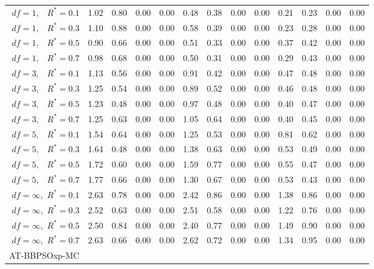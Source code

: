 \documentclass[12pt]{article}
\begin{document}
\begin{appendix}
\begin{table}[ht]
{\begin{tabular}{r|rrrr|rrrr|rrrr}
  $df = 1,\enspace$ $R^* =0.1$ & 1.02 & 0.80 & 0.00 & 0.00 & 0.48 & 0.38 & 0.00 & 0.00 & 0.21 & 0.23 & 0.00 & 0.00 \\ 
  $df = 1,\enspace$ $R^* =0.3$ & 1.10 & 0.88 & 0.00 & 0.00 & 0.58 & 0.39 & 0.00 & 0.00 & 0.23 & 0.28 & 0.00 & 0.00 \\ 
  $df = 1,\enspace$ $R^* =0.5$ & 0.90 & 0.66 & 0.00 & 0.00 & 0.51 & 0.33 & 0.00 & 0.00 & 0.37 & 0.42 & 0.00 & 0.00 \\ 
  $df = 1,\enspace$ $R^* =0.7$ & 0.98 & 0.68 & 0.00 & 0.00 & 0.50 & 0.31 & 0.00 & 0.00 & 0.29 & 0.43 & 0.00 & 0.00 \\ 
  $df = 3,\enspace$ $R^* =0.1$ & 1.13 & 0.56 & 0.00 & 0.00 & 0.91 & 0.42 & 0.00 & 0.00 & 0.47 & 0.48 & 0.00 & 0.00 \\ 
  $df = 3,\enspace$ $R^* =0.3$ & 1.25 & 0.54 & 0.00 & 0.00 & 0.89 & 0.52 & 0.00 & 0.00 & 0.46 & 0.48 & 0.00 & 0.00 \\ 
  $df = 3,\enspace$ $R^* =0.5$ & 1.23 & 0.48 & 0.00 & 0.00 & 0.97 & 0.48 & 0.00 & 0.00 & 0.40 & 0.47 & 0.00 & 0.00 \\ 
  $df = 3,\enspace$ $R^* =0.7$ & 1.25 & 0.63 & 0.00 & 0.00 & 1.05 & 0.64 & 0.00 & 0.00 & 0.40 & 0.45 & 0.00 & 0.00 \\ 
  $df = 5,\enspace$ $R^* =0.1$ & 1.54 & 0.64 & 0.00 & 0.00 & 1.25 & 0.53 & 0.00 & 0.00 & 0.81 & 0.62 & 0.00 & 0.00 \\ 
  $df = 5,\enspace$ $R^* =0.3$ & 1.64 & 0.48 & 0.00 & 0.00 & 1.38 & 0.63 & 0.00 & 0.00 & 0.53 & 0.49 & 0.00 & 0.00 \\ 
  $df = 5,\enspace$ $R^* =0.5$ & 1.72 & 0.60 & 0.00 & 0.00 & 1.59 & 0.77 & 0.00 & 0.00 & 0.55 & 0.47 & 0.00 & 0.00 \\ 
  $df = 5,\enspace$ $R^* =0.7$ & 1.77 & 0.66 & 0.00 & 0.00 & 1.30 & 0.67 & 0.00 & 0.00 & 0.53 & 0.43 & 0.00 & 0.00 \\ 
  $df = \infty,$ $R^* =0.1$ & 2.63 & 0.78 & 0.00 & 0.00 & 2.42 & 0.86 & 0.00 & 0.00 & 1.38 & 0.86 & 0.00 & 0.00 \\ 
  $df = \infty,$ $R^* =0.3$ & 2.52 & 0.63 & 0.00 & 0.00 & 2.51 & 0.58 & 0.00 & 0.00 & 1.22 & 0.76 & 0.00 & 0.00 \\ 
  $df = \infty,$ $R^* =0.5$ & 2.50 & 0.84 & 0.00 & 0.00 & 2.40 & 0.77 & 0.00 & 0.00 & 1.49 & 0.90 & 0.00 & 0.00 \\ 
  $df = \infty,$ $R^* =0.7$ & 2.63 & 0.66 & 0.00 & 0.00 & 2.62 & 0.72 & 0.00 & 0.00 & 1.34 & 0.95 & 0.00 & 0.00 \\ 
\hline
\multicolumn{1}{l|}{AT-BBPSOxp-MC} &&&&&&&&&&&&\\

\end{tabular}}
\end{table}
\end{appendix}
\end{document}
